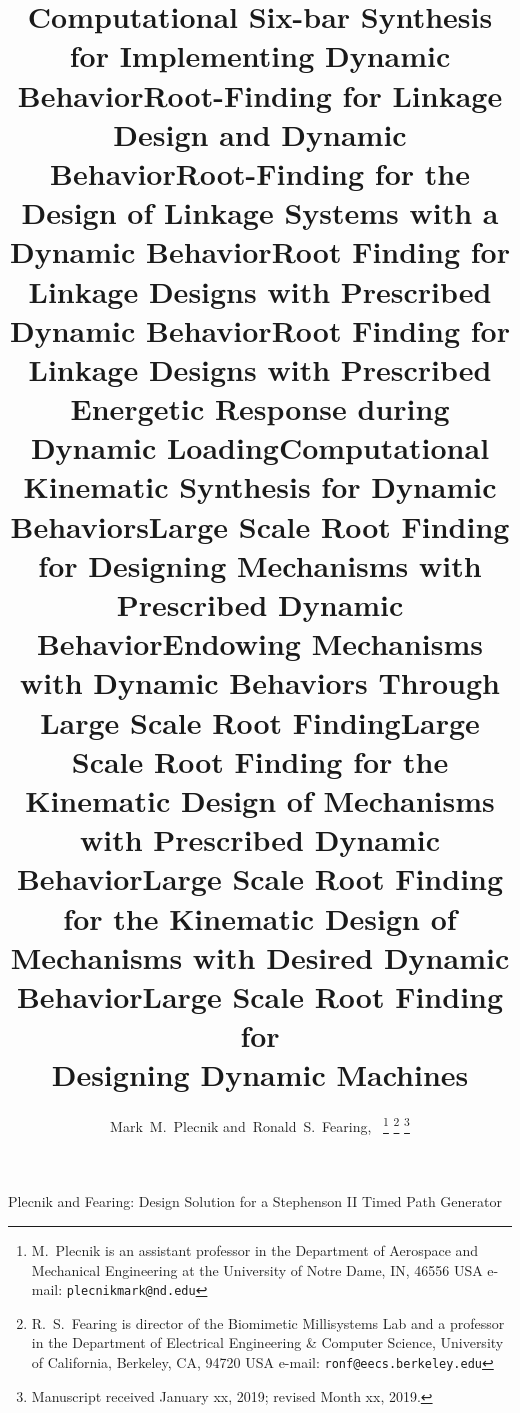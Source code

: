 \documentclass[journal]{IEEEtran}
\begin{document}


\title{Computational Six-bar Synthesis for Implementing Dynamic Behavior}

\title{Root-Finding for Linkage Design and Dynamic Behavior}

\title{Root-Finding for the Design of Linkage Systems with a Dynamic Behavior}

\title{Root Finding for Linkage Designs with Prescribed Dynamic Behavior}

\title{Root Finding for Linkage Designs with Prescribed Energetic Response during Dynamic Loading}

\title{Computational Kinematic Synthesis for Dynamic Behaviors}


\title{Large Scale Root Finding for Designing Mechanisms with Prescribed Dynamic Behavior}

\title{Endowing Mechanisms with Dynamic Behaviors Through Large Scale Root Finding}

\title{Large Scale Root Finding for the Kinematic Design of Mechanisms with Prescribed Dynamic Behavior}

\title{Large Scale Root Finding for the Kinematic Design of Mechanisms with Desired Dynamic Behavior}

\title{Large Scale Root Finding for \\ Designing Dynamic Machines}

\author{Mark~M.~Plecnik %
        and~Ronald~S.~Fearing,~%
\thanks{M.~Plecnik is an assistant professor in the Department of Aerospace and Mechanical Engineering at the University of Notre Dame, IN, 46556 USA e-mail: {\tt\small plecnikmark@nd.edu}}%
\thanks{R.~S.~Fearing is director of the Biomimetic Millisystems Lab and a professor in the Department of Electrical Engineering \& Computer Science, University of California, Berkeley, CA, 94720 USA e-mail: {\tt\small ronf@eecs.berkeley.edu}}%
\thanks{Manuscript received January xx, 2019; revised Month xx, 2019.}}

%
{Plecnik and Fearing: Design Solution for a Stephenson II Timed Path Generator}
\end{document}
